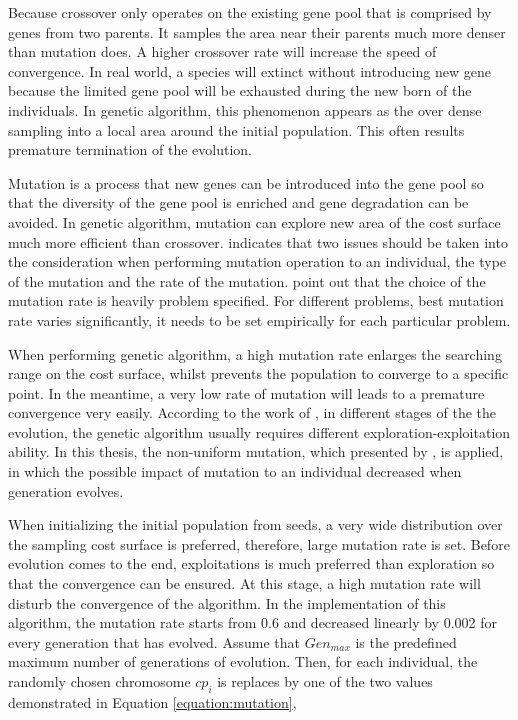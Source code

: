 Because crossover only operates on the existing gene pool that is comprised by genes from two parents. It samples the area near their parents much more denser than mutation does. A higher crossover rate will increase the speed of convergence. In real world, a species will extinct without introducing new gene because the limited gene pool will be exhausted during the new born of the individuals. In genetic algorithm, this phenomenon appears as the over dense sampling into a local area around the initial population. This often results premature termination of the evolution. 

Mutation is a process that new genes can be introduced into the gene pool so that the diversity of the gene pool is enriched and gene degradation can be avoided. In genetic algorithm, mutation can explore new area of the cost surface much more efficient than crossover.  indicates that two issues should be taken into the consideration when performing mutation operation to an individual, the type of the mutation and the rate of the mutation.  point out that the choice of the mutation rate is heavily problem specified. For different problems, best mutation rate varies significantly, it needs to be set empirically for each particular problem. 

When performing genetic algorithm, a high mutation rate enlarges the searching range on the cost surface, whilst prevents the population to converge to a specific point. In the meantime, a very low rate of mutation will leads to a premature convergence very easily. According to the work of  , in different stages of the the evolution, the genetic algorithm usually requires different exploration-exploitation ability. In this thesis, the non-uniform mutation, which presented by , is applied, in which the possible impact of mutation to an individual decreased when generation evolves. 

When initializing the initial population from seeds, a very wide distribution over the sampling cost surface is preferred, therefore, large mutation rate is set. Before evolution comes to the end, exploitations is much preferred than exploration so that the convergence can be ensured. At this stage, a high mutation rate will disturb the convergence of the algorithm. In the implementation of this algorithm, the mutation rate starts from 0.6 and decreased linearly by 0.002 for every generation that has evolved. Assume that $Gen_{max}$ is the predefined maximum number of generations of evolution. Then, for each individual, the randomly chosen chromosome $cp_{i}$ is replaces by one of the two values demonstrated in Equation \ref{equation:mutation},

